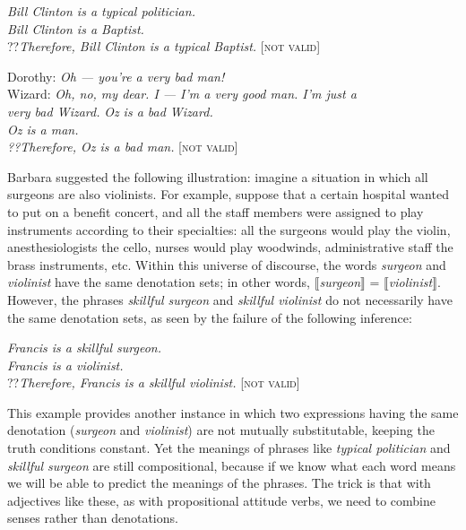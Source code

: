 \ea \label{ex:15.6}
\textit{Bill Clinton is a typical politician.}\\
\textit{Bill Clinton is a Baptist.}\\\FelixHRule
??\textit{Therefore, Bill Clinton is a typical Baptist.} \hfill  [\textsc{not valid}]
\z

\ea \label{ex:15.7}
\ea  Dorothy: \textit{Oh — you’re a very bad man!}\\
Wizard: \textit{Oh, no, my dear. I — I’m a very good man. I’m just a \\
\hspace{1.2cm} very bad Wizard.} 
\ex  
  \textit{Oz is a bad Wizard.}\\
\textit{Oz is a man.\\
\FelixHRule
??Therefore, Oz is a bad man.}  \hfill [\textsc{not valid}]
\z \z


Barbara \citet{Partee1995} suggested the following illustration: imagine a situation in which all surgeons are also violinists. For example, suppose that a certain hospital wanted to put on a benefit concert, and all the staff members were assigned to play instruments according to their specialties: all the surgeons would play the violin, anesthesiologists the cello, nurses would play woodwinds, administrative staff the brass instruments, etc. Within this universe of discourse, the words \textit{surgeon} and \textit{violinist} have the same denotation sets; in other words, $\llbracket$\textit{surgeon}$\rrbracket$  = $\llbracket$\textit{violinist}$\rrbracket$. However, the phrases \textit{skillful surgeon} and \textit{skillful violinist} do not necessarily have the same denotation sets, as seen by the failure of the following inference:


\ea \label{ex:15.8}
\textit{Francis is a skillful surgeon.}\\
\textit{Francis is a violinist.}\\
\FelixHRule
??\textit{Therefore, Francis is a skillful violinist.}  \hfill [\textsc{not valid}]
\z


This example provides another instance in which two expressions having the same denotation (\textit{surgeon} and \textit{violinist}) are not mutually substitutable, keeping the truth conditions constant. Yet the meanings of phrases like \textit{typical politician} and \textit{skillful surgeon} are still compositional, because if we know what each word means we will be able to predict the meanings of the phrases. The trick is that with adjectives like these, as with propositional attitude verbs, we need to combine senses rather than denotations.



